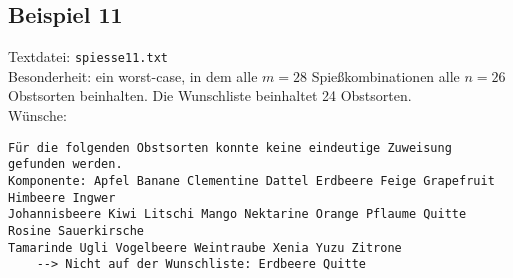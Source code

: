 \subsection{Beispiel 11}\label{example:11}
Textdatei: \texttt{spiesse11.txt}\\
Besonderheit: ein worst-case, in dem alle $m = 28$ Spießkombinationen alle $n = 26$ Obstsorten beinhalten. Die Wunschliste beinhaltet 24 Obstsorten.\\

\noindent
Wünsche: \\
\vspace{7pt}

\noindent
{}
\begin{verbatim}
Für die folgenden Obstsorten konnte keine eindeutige Zuweisung gefunden werden.
Komponente: Apfel Banane Clementine Dattel Erdbeere Feige Grapefruit Himbeere Ingwer
Johannisbeere Kiwi Litschi Mango Nektarine Orange Pflaume Quitte Rosine Sauerkirsche
Tamarinde Ugli Vogelbeere Weintraube Xenia Yuzu Zitrone 
	--> Nicht auf der Wunschliste: Erdbeere Quitte
\end{verbatim}

